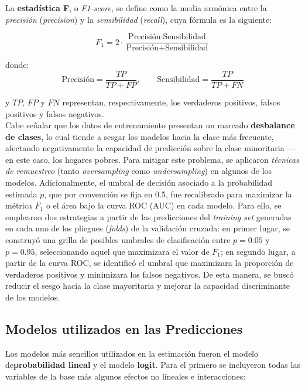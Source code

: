 \documentclass[12pt,a4paper,onecolumn]{article}
\begin{document}
La \textbf{estadística F}, o \textit{F1-score}, se define como la media armónica entre la \textit{precisión} 
(\textit{precision}) y la \textit{sensibilidad} (\textit{recall}), cuya fórmula es la siguiente:

\begin{equation}
F_1 = 2 \cdot \frac{\text{Precisión} \cdot \text{Sensibilidad}}{\text{Precisión} + \text{Sensibilidad}}
\end{equation}

donde:
\begin{equation}
\text{Precisión} = \frac{TP}{TP + FP}, \qquad 
\text{Sensibilidad} = \frac{TP}{TP + FN}
\end{equation}

y \(TP\), \(FP\) y \(FN\) representan, respectivamente, los verdaderos positivos, falsos positivos y falsos negativos. \\

Cabe señalar que los datos de entrenamiento presentan un marcado \textbf{desbalance de clases}, 
lo cual tiende a sesgar los modelos hacia la clase más frecuente, afectando negativamente la capacidad de predicción 
sobre la clase minoritaria —en este caso, los hogares pobres. 
Para mitigar este problema, se aplicaron \textit{técnicas de remuestreo} (tanto \textit{oversampling} como \textit{undersampling}) 
en algunos de los modelos. Adicionalmente, el umbral de decisión asociado a la probabilidad estimada \(p\), que por convención se fija en 0.5, fue recalibrado para maximizar la métrica \(F_1\) o el área bajo la curva ROC (AUC) en cada modelo. Para ello, se emplearon dos estrategias a partir de las predicciones del \textit{training set} generadas en cada uno de los pliegues (\textit{folds}) de la validación cruzada: en primer lugar, se construyó una grilla de posibles umbrales de clasificación entre \(p = 0.05\) y \(p = 0.95\), seleccionando aquel que maximizara el valor de \(F_1\); en segundo lugar, a partir de la curva ROC, se identificó el umbral que maximizara la proporción de verdaderos positivos y minimizara los falsos negativos. De esta manera, se buscó reducir el sesgo hacia la clase mayoritaria y mejorar la capacidad discriminante de los modelos.\\

\subsection{Modelos utilizados en las Predicciones}

Los modelos más sencillos utilizados en la estimación fueron el modelo de\textbf{probabilidad lineal} y el modelo \textbf{logit}. Para el primero se incluyeron todas las variables de la base más algunos efectos no lineales e interacciones:
\end{document}
